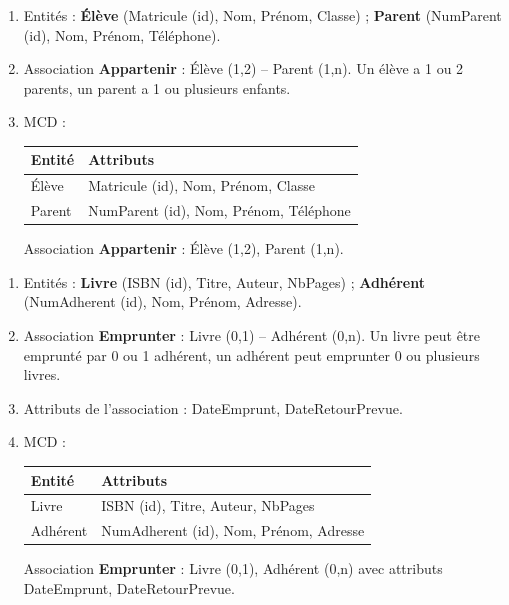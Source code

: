 \begin{enumerate}
    \item Entités : \textbf{Élève} (Matricule (id), Nom, Prénom, Classe) ; \textbf{Parent} (NumParent (id), Nom, Prénom, Téléphone).
    \item Association \textbf{Appartenir} : Élève (1,2) -- Parent (1,n). Un élève a 1 ou 2 parents, un parent a 1 ou plusieurs enfants.
    \item MCD :
    \begin{center}
    \begin{tabular}{|l|l|}
    \hline
    \textbf{Entité} & \textbf{Attributs} \\
    \hline
    Élève & Matricule (id), Nom, Prénom, Classe \\
    \hline
    Parent & NumParent (id), Nom, Prénom, Téléphone \\
    \hline
    \end{tabular}
    \end{center}
    Association \textbf{Appartenir} : Élève (1,2), Parent (1,n).
\end{enumerate}

\begin{enumerate}
    \item Entités : \textbf{Livre} (ISBN (id), Titre, Auteur, NbPages) ; \textbf{Adhérent} (NumAdherent (id), Nom, Prénom, Adresse).
    \item Association \textbf{Emprunter} : Livre (0,1) -- Adhérent (0,n). Un livre peut être emprunté par 0 ou 1 adhérent, un adhérent peut emprunter 0 ou plusieurs livres.
    \item Attributs de l'association : DateEmprunt, DateRetourPrevue.
    \item MCD :
    \begin{center}
    \begin{tabular}{|l|l|}
    \hline
    \textbf{Entité} & \textbf{Attributs} \\
    \hline
    Livre & ISBN (id), Titre, Auteur, NbPages \\
    \hline
    Adhérent & NumAdherent (id), Nom, Prénom, Adresse \\
    \hline
    \end{tabular}
    \end{center}
    Association \textbf{Emprunter} : Livre (0,1), Adhérent (0,n) avec attributs DateEmprunt, DateRetourPrevue.
\end{enumerate}

